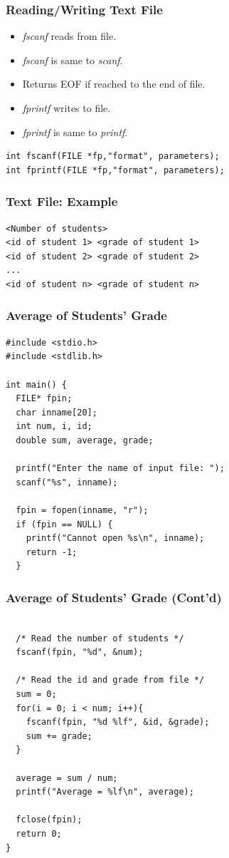 \documentclass{../c-lecture}
\begin{document}
\begin{frame}[fragile]
  \frametitle{Reading/Writing Text File}
  \begin{itemize}
    \item \textit{\color{YellowOrange} fscanf} reads from file.
    \item
      \textit{\color{YellowOrange}fscanf} is same to
      \textit{\color{LimeGreen} scanf}.

    \item Returns EOF if reached to the end of file.
    \item \textit{\color{Cyan} fprintf} writes to file.
    \item
      \textit{\color{Cyan} fprintf} is same to
      \textit{\color{Violet} printf}.

  \end{itemize}
  \begin{verbatim}
int fscanf(FILE *fp,"format", parameters);
int fprintf(FILE *fp,"format", parameters);
  \end{verbatim}
\end{frame}

\begin{frame}[fragile]
  \frametitle{Text File: Example}
  \begin{verbatim}
<Number of students>
<id of student 1> <grade of student 1>
<id of student 2> <grade of student 2>
...
<id of student n> <grade of student n>
  \end{verbatim}
\end{frame}

\begin{frame}[fragile]
  \frametitle{Average of Students' Grade}
  \tiny
  \begin{verbatim}
#include <stdio.h>
#include <stdlib.h>

int main() {
  FILE* fpin;
  char inname[20];
  int num, i, id;
  double sum, average, grade;

  printf("Enter the name of input file: ");
  scanf("%s", inname);

  fpin = fopen(inname, "r");
  if (fpin == NULL) {
    printf("Cannot open %s\n", inname);
    return -1;
  }
  \end{verbatim}
\end{frame}

\begin{frame}[fragile]
  \frametitle{Average of Students' Grade (Cont'd)}
  \tiny
  \begin{verbatim}

  /* Read the number of students */
  fscanf(fpin, "%d", &num);

  /* Read the id and grade from file */
  sum = 0;
  for(i = 0; i < num; i++){
    fscanf(fpin, "%d %lf", &id, &grade);
    sum += grade;
  }

  average = sum / num;
  printf("Average = %lf\n", average);

  fclose(fpin);
  return 0;
}
  \end{verbatim}
\end{frame}
\end{document}

